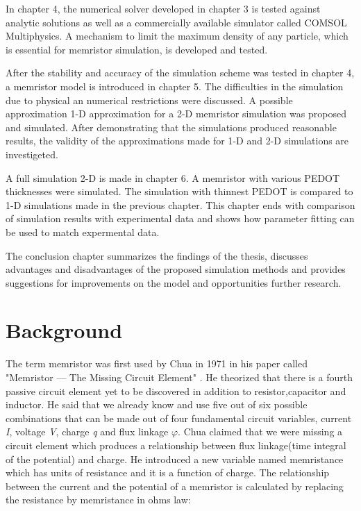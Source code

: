 In chapter 4, the numerical solver developed in chapter 3 is tested against analytic solutions as well as a commercially available simulator called COMSOL Multiphysics. A mechanism to limit the maximum density of any particle, which is essential for memristor simulation, is developed and tested. 

After the stability and accuracy of the simulation scheme was tested in chapter 4, a memristor model is introduced in chapter 5. The difficulties in the simulation due to physical an numerical restrictions were discussed. A possible approximation 1-D approximation for a 2-D memristor simulation was proposed and simulated. After demonstrating that the simulations produced reasonable results, the validity of the approximations made for 1-D and 2-D simulations are investigeted.  

A full simulation 2-D is made in chapter 6. A memristor with various PEDOT thicknesses were simulated. The simulation with thinnest PEDOT is compared to 1-D simulations made in the previous chapter. This chapter ends with comparison of simulation results with experimental data and shows how parameter fitting can be used to match expermental data.

The conclusion chapter summarizes the findings of the thesis, discusses advantages and disadvantages of the proposed simulation methods and provides suggestions for improvements on the model and opportunities further research.


\section{Background}
The term memristor was first used by Chua in 1971 in his paper called  "Memristor — The Missing Circuit Element" \cite{chua}. He theorized that there is a fourth passive circuit element yet to be discovered in addition to resistor,capacitor and inductor. He said that we already know and use five out of six possible combinations that can be made out of four fundamental circuit variables, current \textit{I}, voltage \textit{V}, charge \textit{q} and flux linkage \textit{$\varphi$}. Chua claimed that we were missing a circuit element which produces a relationship between flux linkage(time integral of the potential) and charge. He introduced a new variable named memristance which has units of resistance and it is a function of charge. The relationship between the current and the potential of a memristor is calculated by replacing the resistance by memristance in ohms law:

